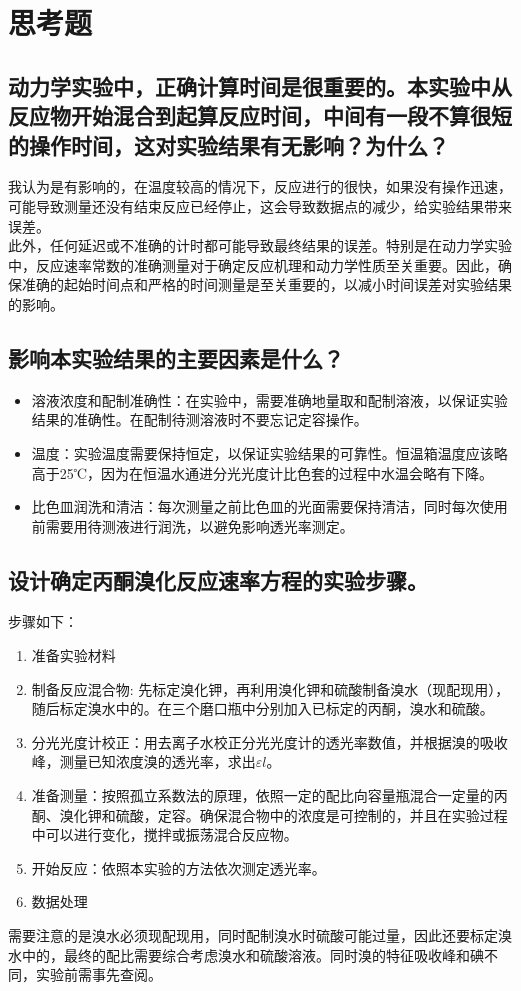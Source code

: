\documentclass[hyperref,a4paper,UTF8]{ctexart}
\begin{document}
\section{思考题}
\subsection{动力学实验中，正确计算时间是很重要的。本实验中从反应物开始混合到起算反应时间，中间有一段不算很短的操作时间，这对实验结果有无影响？为什么？}
我认为是有影响的，在温度较高的情况下，反应进行的很快，如果没有操作迅速，可能导致测量还没有结束反应已经停止，这会导致数据点的减少，给实验结果带来误差。\\
此外，任何延迟或不准确的计时都可能导致最终结果的误差。特别是在动力学实验中，反应速率常数的准确测量对于确定反应机理和动力学性质至关重要。因此，确保准确的起始时间点和严格的时间测量是至关重要的，以减小时间误差对实验结果的影响。
\subsection{影响本实验结果的主要因素是什么？}
  \begin{itemize}
      \item 溶液浓度和配制准确性：在实验中，需要准确地量取和配制溶液，以保证实验结果的准确性。在配制待测溶液时不要忘记定容操作。
      \item 温度：实验温度需要保持恒定，以保证实验结果的可靠性。恒温箱温度应该略高于25℃，因为在恒温水通进分光光度计比色套的过程中水温会略有下降。
      \item 比色皿润洗和清洁：每次测量之前比色皿的光面需要保持清洁，同时每次使用前需要用待测液进行润洗，以避免影响透光率测定。

  \end{itemize}
  \subsection{设计确定丙酮溴化反应速率方程的实验步骤。}
    步骤如下：
    \begin{enumerate}
        \item 准备实验材料
        \item 制备反应混合物: 先标定溴化钾，再利用溴化钾和硫酸制备溴水（现配现用），随后标定溴水中的。在三个磨口瓶中分别加入已标定的丙酮，溴水和硫酸。
        \item 分光光度计校正：用去离子水校正分光光度计的透光率数值，并根据溴的吸收峰，测量已知浓度溴的透光率，求出$\varepsilon l$。
        \item 准备测量：按照孤立系数法的原理，依照一定的配比向容量瓶混合一定量的丙酮、溴化钾和硫酸，定容。确保混合物中的浓度是可控制的，并且在实验过程中可以进行变化，搅拌或振荡混合反应物。
        \item 开始反应：依照本实验的方法依次测定透光率。
        \item 数据处理
    \end{enumerate}

需要注意的是溴水必须现配现用，同时配制溴水时硫酸可能过量，因此还要标定溴水中的，最终的配比需要综合考虑溴水和硫酸溶液。同时溴的特征吸收峰和碘不同，实验前需事先查阅。
\end{document}
